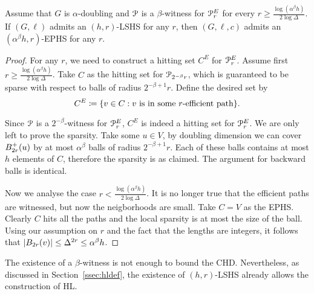 \begin{theorem}\label{theo:witness_doubling}
Assume that $G$ is $\alpha$-doubling and $\mathcal{P}$ is a $\beta$-witness for $\mathcal{P}^E_r$ for every $r\geq \frac{\log(\alpha^\beta h)}{2\log\Delta}$. 
If $(G,\ell)$ admits an $(h,r)$-LSHS for any $r$, then $(G,\ell,c)$ admits an $(\alpha^{\beta} h,r)$-EPHS for any $r$.
\end{theorem}
\begin{proof}
For any $r$, we need to construct a hitting set $C^E$ for $\mathcal{P}_r^E$.
Assume first $r\geq \frac{\log(\alpha^\beta h)}{2\log\Delta}$.
Take $C$ as the hitting set for $\mathcal{P}_{2^{-\beta}r}$, which is guaranteed to be sparse with respect to balls of radius $2^{-\beta+1}r$.
Define the desired set by
\[
C^E\coloneqq\{v\in C: v \text{ is in some $r$-efficient path} \}.
\]

Since $\mathcal{P}$ is a $2^{-\beta}$-witness for $\mathcal{P}^E_r$, $C^E$ is indeed a hitting set for $\mathcal{P}^E_r$.
We are only left to prove the sparsity.
Take some $u\in V$, by doubling dimension we can cover $B^+_{2r}(u)$ by at most $\alpha^\beta$ balls of radius $2^{-\beta+1}r$.
Each of these balls contains at most $h$ elements of $C$, therefore the sparsity is as claimed.
The argument for backward balls is identical.

Now we analyse the case $r< \frac{\log(\alpha^\beta h)}{2\log\Delta}$.
It is no longer true that the efficient paths are witnessed, but now the neigborhoods are small.
Take $C=V$ as the EPHS.
Clearly $C$ hits all the paths and the local sparsity is at most the size of the ball.
Using our assumption on $r$ and the fact that the lengths are integers, it follows that $\lvert B_{2r}(v)\rvert\leq\Delta^{2r}\leq\alpha^\beta h$. 
\end{proof}

\begin{remark}
The existence of a $\beta$-witness is not enough to bound the CHD.
Nevertheless, as discussed in Section~\ref{ssec:hldef}, the existence of $(h,r)$-LSHS already allows the construction of HL.
\end{remark}
